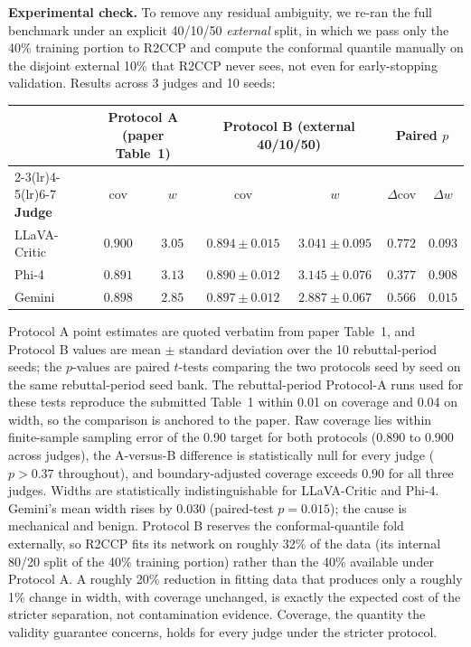 \documentclass[11pt]{article}
\begin{document}
\textbf{Experimental check.} To remove any residual ambiguity, we re-ran the full benchmark under an explicit 40/10/50 \emph{external} split, in which we pass only the 40\% training portion to R2CCP and compute the conformal quantile manually on the disjoint external 10\% that R2CCP never sees, not even for early-stopping validation. Results across 3 judges and 10 seeds:

\begin{center}
\footnotesize
\setlength{\tabcolsep}{4pt}
\begin{tabular}{l cc cc cc}
\toprule
 & \multicolumn{2}{c}{\textbf{Protocol A (paper Table~1)}} & \multicolumn{2}{c}{\textbf{Protocol B (external 40/10/50)}} & \multicolumn{2}{c}{\textbf{Paired $p$}} \\
\cmidrule(lr){2-3}\cmidrule(lr){4-5}\cmidrule(lr){6-7}
\textbf{Judge} & cov & $w$ & cov & $w$ & $\Delta$cov & $\Delta w$ \\
\midrule
LLaVA-Critic & $0.900$ & $3.05$ & $0.894 \pm 0.015$ & $3.041 \pm 0.095$ & $0.772$ & $0.093$ \\
Phi-4        & $0.891$ & $3.13$ & $0.890 \pm 0.012$ & $3.145 \pm 0.076$ & $0.377$ & $0.908$ \\
Gemini       & $0.898$ & $2.85$ & $0.897 \pm 0.012$ & $2.887 \pm 0.067$ & $0.566$ & $0.015$ \\
\bottomrule
\end{tabular}
\end{center}

Protocol A point estimates are quoted verbatim from paper Table~1, and Protocol B values are mean $\pm$ standard deviation over the 10 rebuttal-period seeds; the $p$-values are paired $t$-tests comparing the two protocols seed by seed on the same rebuttal-period seed bank. The rebuttal-period Protocol-A runs used for these tests reproduce the submitted Table~1 within 0.01 on coverage and 0.04 on width, so the comparison is anchored to the paper. Raw coverage lies within finite-sample sampling error of the 0.90 target for both protocols (0.890 to 0.900 across judges), the A-versus-B difference is statistically null for every judge ($p > 0.37$ throughout), and boundary-adjusted coverage exceeds 0.90 for all three judges. Widths are statistically indistinguishable for LLaVA-Critic and Phi-4. Gemini's mean width rises by 0.030 (paired-test $p = 0.015$); the cause is mechanical and benign. Protocol B reserves the conformal-quantile fold externally, so R2CCP fits its network on roughly 32\% of the data (its internal 80/20 split of the 40\% training portion) rather than the 40\% available under Protocol A. A roughly 20\% reduction in fitting data that produces only a roughly 1\% change in width, with coverage unchanged, is exactly the expected cost of the stricter separation, not contamination evidence. Coverage, the quantity the validity guarantee concerns, holds for every judge under the stricter protocol.
\end{document}
